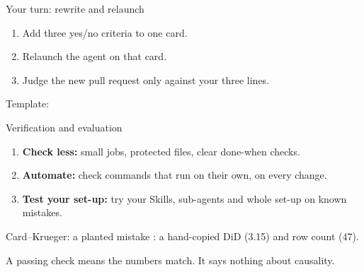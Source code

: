 \begin{frame}{Your turn: rewrite and relaunch}
  \vspace{0.3em}
  \begin{enumerate}
    \item Add three yes/no criteria to one card.
    \item Relaunch the agent on that card.
    \item Judge the new pull request only against your three lines.
  \end{enumerate}
  \vspace{0.4em}
  {\small Template: }
\end{frame}

\begin{frame}{Verification and evaluation}
  \begin{enumerate}
    \item \textbf{Check less:} small jobs, protected files, clear done-when checks.
    \item \textbf{Automate:} check commands that run on their own, on every change.
    \item \textbf{Test your set-up:} try your Skills, sub-agents and whole set-up
      on known mistakes.
  \end{enumerate}
\end{frame}

\begin{frame}{Card--Krueger: a planted mistake}
  : a hand-copied DiD (3.15) and row count (47).
  \vspace{0.5em}
  \begin{center}
  \end{center}
  \vspace{0.4em}
  A passing check means the numbers match. It says nothing about causality.
\end{frame}

